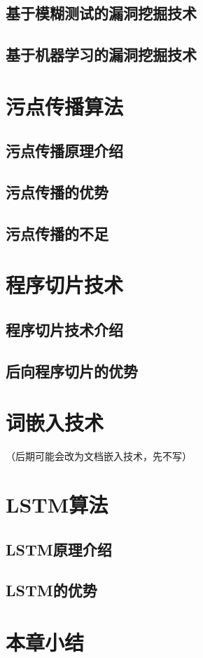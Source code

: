 \subsection{基于模糊测试的漏洞挖掘技术}

\subsection{基于机器学习的漏洞挖掘技术}

\section{污点传播算法}

\subsection{污点传播原理介绍}

\subsection{污点传播的优势}

\subsection{污点传播的不足}

\section{程序切片技术}
\subsection{程序切片技术介绍}

\subsection{后向程序切片的优势}

\section{词嵌入技术}
（后期可能会改为文档嵌入技术，先不写）

\section{LSTM算法}
\subsection{LSTM原理介绍}
\subsection{LSTM的优势}

\section{本章小结}